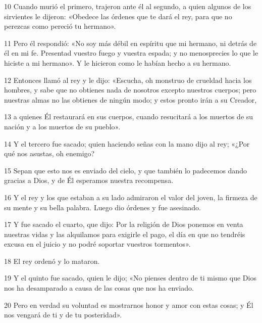 \par 10 Cuando murió el primero, trajeron ante él al segundo, a quien algunos de los sirvientes le dijeron: «Obedece las órdenes que te dará el rey, para que no perezcas como pereció tu hermano».

\par 11 Pero él respondió: «No soy más débil en espíritu que mi hermano, ni detrás de él en mi fe. Presentad vuestro fuego y vuestra espada; y no menosprecies lo que le hiciste a mi hermano». Y le hicieron como le habían hecho a su hermano.

\par 12 Entonces llamó al rey y le dijo: «Escucha, oh monstruo de crueldad hacia los hombres, y sabe que no obtienes nada de nosotros excepto nuestros cuerpos; pero nuestras almas no las obtienes de ningún modo; y estos pronto irán a su Creador,

\par 13 a quienes Él restaurará en sus cuerpos, cuando resucitará a los muertos de su nación y a los muertos de su pueblo».

\par 14 Y el tercero fue sacado; quien haciendo señas con la mano dijo al rey; «¿Por qué nos asustas, oh enemigo?

\par 15 Sepan que esto nos es enviado del cielo, y que también lo padecemos dando gracias a Dios, y de Él esperamos nuestra recompensa.

\par 16 Y el rey y los que estaban a su lado admiraron el valor del joven, la firmeza de su mente y su bella palabra. Luego dio órdenes y fue asesinado.

\par 17 Y fue sacado el cuarto, que dijo: Por la religión de Dios ponemos en venta nuestras vidas y las alquilamos para exigirle el pago, el día en que no tendréis excusa en el juicio y no podré soportar vuestros tormentos».

\par 18 El rey ordenó y lo mataron.

\par 19 Y el quinto fue sacado, quien le dijo; «No pienses dentro de ti mismo que Dios nos ha desamparado a causa de las cosas que nos ha enviado.

\par 20 Pero en verdad su voluntad es mostrarnos honor y amor con estas cosas; y Él nos vengará de ti y de tu posteridad».

